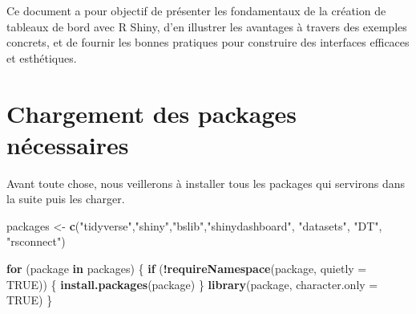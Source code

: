 \documentclass[
]{article}
\newenvironment{Shaded}{\begin{snugshade}}{\end{snugshade}}
\newcommand{\AttributeTok}[1]{\textcolor[rgb]{0.13,0.29,0.53}{#1}}
\newcommand{\ConstantTok}[1]{\textcolor[rgb]{0.56,0.35,0.01}{#1}}
\newcommand{\ControlFlowTok}[1]{\textcolor[rgb]{0.13,0.29,0.53}{\textbf{#1}}}
\newcommand{\FunctionTok}[1]{\textcolor[rgb]{0.13,0.29,0.53}{\textbf{#1}}}
\newcommand{\NormalTok}[1]{#1}
\newcommand{\OtherTok}[1]{\textcolor[rgb]{0.56,0.35,0.01}{#1}}
\newcommand{\SpecialCharTok}[1]{\textcolor[rgb]{0.81,0.36,0.00}{\textbf{#1}}}
\newcommand{\StringTok}[1]{\textcolor[rgb]{0.31,0.60,0.02}{#1}}
\begin{document}
Ce document a pour objectif de présenter les fondamentaux de la création
de tableaux de bord avec R Shiny, d'en illustrer les avantages à travers
des exemples concrets, et de fournir les bonnes pratiques pour
construire des interfaces efficaces et esthétiques.

\newpage

\section{Chargement des packages
nécessaires}\label{chargement-des-packages-nuxe9cessaires}

Avant toute chose, nous veillerons à installer tous les packages qui
servirons dans la suite puis les charger.

\begin{Shaded}
\begin{Highlighting}[]
\NormalTok{packages }\OtherTok{\textless{}{-}} \FunctionTok{c}\NormalTok{(}\StringTok{"tidyverse"}\NormalTok{,}\StringTok{"shiny"}\NormalTok{,}\StringTok{"bslib"}\NormalTok{,}\StringTok{"shinydashboard"}\NormalTok{, }\StringTok{"datasets"}\NormalTok{, }
              \StringTok{"DT"}\NormalTok{, }\StringTok{"rsconnect"}\NormalTok{)}

\ControlFlowTok{for}\NormalTok{ (package }\ControlFlowTok{in}\NormalTok{ packages) \{}
  \ControlFlowTok{if}\NormalTok{ (}\SpecialCharTok{!}\FunctionTok{requireNamespace}\NormalTok{(package, }\AttributeTok{quietly =} \ConstantTok{TRUE}\NormalTok{)) \{}
    \FunctionTok{install.packages}\NormalTok{(package)}
\NormalTok{  \}}
  \FunctionTok{library}\NormalTok{(package, }\AttributeTok{character.only =} \ConstantTok{TRUE}\NormalTok{)}
\NormalTok{\}}
\end{Highlighting}
\end{Shaded}
\end{document}
